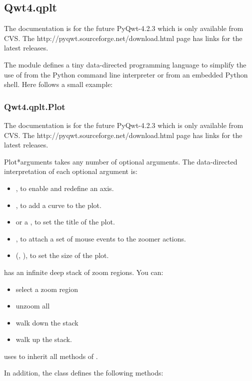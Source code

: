 \documentclass{manual}
\newcommand{\Download}{\ulink{download}
  {http://pyqwt.sourceforge.net/download.html}}
\newcommand{\Future}{
  \begin{notice}[warning]
    The documentation is for the future PyQwt-4.2.3 which is only available
    from CVS. The \Download{} page has links for the latest releases.
  \end{notice}
}
\begin{document}
\subsection{Qwt4.qplt \label{qwt-qplt}}

\Future{}

The module  defines a tiny data-directed programming
language to simplify the use of  from the Python command
line interpreter or from an embedded Python shell.
Here follows a small example:



\subsubsection{Qwt4.qplt.Plot \label{intro-qplt-plot}}

\Future{}

\begin{classdesc}{Plot}{*arguments}
   takes any number of optional arguments.
  The data-directed interpretation of each optional argument is:
  \begin{itemize}
  \item
    , to enable and redefine an axis.
  \item
    , to add a curve to the plot.
  \item
     or a , to set the title of the plot.
  \item
    , to attach a set of mouse events to the zoomer actions.
  \item
    (, ), to set the size of the plot.
  \end{itemize}

   has an infinite deep stack of zoom regions. You can:
  \begin{itemize}
    \item
      select a zoom region
    \item
      unzoom all
    \item
      walk down the stack
    \item
      walk up the stack.
  \end{itemize}

   uses  to inherit all methods of
  .
\end{classdesc}

In addition, the class  defines the following methods:
\end{document}
